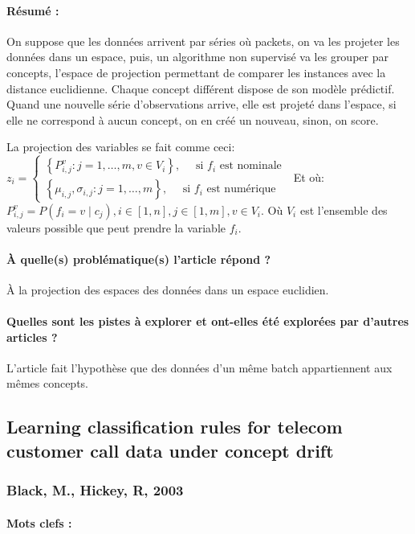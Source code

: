 \documentclass[11pt,a4paper]{report}
\begin{document}
\paragraph{Résumé :} On suppose que les données arrivent par séries où packets, on va les projeter les données dans un espace, puis, un algorithme non supervisé va les grouper par concepts, l'espace de projection permettant de comparer les instances avec la distance euclidienne. Chaque concept différent dispose de son modèle prédictif. Quand une nouvelle série d'observations arrive, elle est projeté dans l'espace, si elle ne correspond à aucun concept, on en créé un nouveau, sinon, on score.

La projection des variables se fait comme ceci: $z_{i}=\left\{\begin{array}{l}
\left\{P_{i, j}^{v}: j=1, \ldots, m, v \in V_{i}\right\}, \quad \text { si } f_{i} \text { est nominale } \\
\left\{\mu_{i, j}, \sigma_{i, j}: j=1, \ldots, m\right\}, \quad \text { si } f_{i} \text { est numérique }
\end{array}\right.$
Et où:
$P_{i, j}^{v}=P\left(f_{i}=v \mid c_{j}\right), i \in[1, n], j \in[1, m], v \in V_{i}$. Où $V_{i}$ est l'ensemble des valeurs possible que peut prendre la variable $f_{i}$.
\paragraph{À quelle(s) problématique(s) l'article répond ?} À la projection des espaces des données dans un espace euclidien.

\paragraph{Quelles sont les pistes à explorer et ont-elles  été explorées par d'autres articles ?} L'article fait l'hypothèse que des données d'un même batch appartiennent aux mêmes concepts.


\subsection{Learning classification rules for telecom  customer call data under concept drift}
\subsubsection{Black, M., Hickey, R, 2003}

\paragraph{Mots clefs :}
\end{document}
